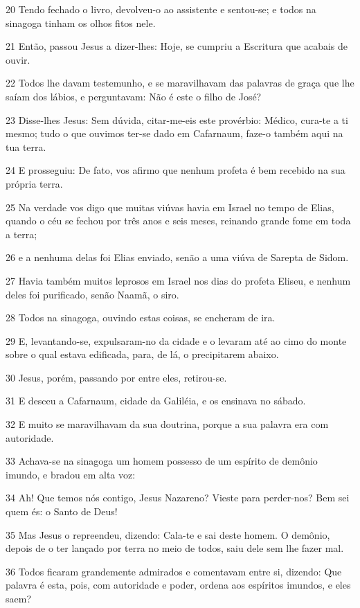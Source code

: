 \par 20 Tendo fechado o livro, devolveu-o ao assistente e sentou-se; e todos na sinagoga tinham os olhos fitos nele.
\par 21 Então, passou Jesus a dizer-lhes: Hoje, se cumpriu a Escritura que acabais de ouvir.
\par 22 Todos lhe davam testemunho, e se maravilhavam das palavras de graça que lhe saíam dos lábios, e perguntavam: Não é este o filho de José?
\par 23 Disse-lhes Jesus: Sem dúvida, citar-me-eis este provérbio: Médico, cura-te a ti mesmo; tudo o que ouvimos ter-se dado em Cafarnaum, faze-o também aqui na tua terra.
\par 24 E prosseguiu: De fato, vos afirmo que nenhum profeta é bem recebido na sua própria terra.
\par 25 Na verdade vos digo que muitas viúvas havia em Israel no tempo de Elias, quando o céu se fechou por três anos e seis meses, reinando grande fome em toda a terra;
\par 26 e a nenhuma delas foi Elias enviado, senão a uma viúva de Sarepta de Sidom.
\par 27 Havia também muitos leprosos em Israel nos dias do profeta Eliseu, e nenhum deles foi purificado, senão Naamã, o siro.
\par 28 Todos na sinagoga, ouvindo estas coisas, se encheram de ira.
\par 29 E, levantando-se, expulsaram-no da cidade e o levaram até ao cimo do monte sobre o qual estava edificada, para, de lá, o precipitarem abaixo.
\par 30 Jesus, porém, passando por entre eles, retirou-se.
\par 31 E desceu a Cafarnaum, cidade da Galiléia, e os ensinava no sábado.
\par 32 E muito se maravilhavam da sua doutrina, porque a sua palavra era com autoridade.
\par 33 Achava-se na sinagoga um homem possesso de um espírito de demônio imundo, e bradou em alta voz:
\par 34 Ah! Que temos nós contigo, Jesus Nazareno? Vieste para perder-nos? Bem sei quem és: o Santo de Deus!
\par 35 Mas Jesus o repreendeu, dizendo: Cala-te e sai deste homem. O demônio, depois de o ter lançado por terra no meio de todos, saiu dele sem lhe fazer mal.
\par 36 Todos ficaram grandemente admirados e comentavam entre si, dizendo: Que palavra é esta, pois, com autoridade e poder, ordena aos espíritos imundos, e eles saem?
